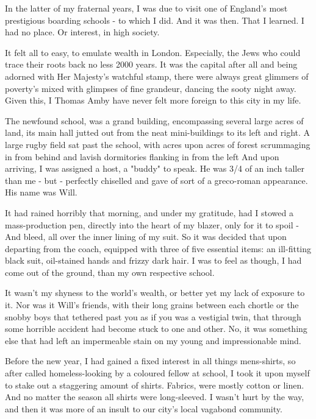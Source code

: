 \documentclass[12pt,openany]{book}
\begin{document}
In the latter of my fraternal years, I was
due to visit one of England's most
prestigious boarding schools - to which I did.
And it was then. That I learned. I had no place.
Or interest, in high society.

It felt all to easy, to emulate wealth
in London. Especially, the Jews
who could trace their roots back
no less 2000 years.
It was the capital after all and being
adorned with Her Majesty's watchful stamp,
there were always great glimmers of poverty's
mixed with glimpses of fine grandeur,
dancing the sooty night away. Given this,
I Thomas Amby have never felt more foreign
to this city in my life.

The newfound school, was a grand building,
encompassing several large acres of land, its main
hall jutted out from the neat
mini-buildings to its left and right.
A large rugby field sat past
the school, with acres upon
acres of forest scrummaging
in from behind and lavish dormitories flanking
in from the left
And upon arriving, I was
assigned a host, a "buddy" to speak. He
was 3/4 of an inch taller than me - but -
perfectly chiselled and gave of sort of a
greco-roman appearance. His name was Will.

It had rained horribly that morning,
and under my gratitude, had I stowed
a mass-production pen,
directly into the heart of my blazer,
only for it to spoil - And bleed,
all over the inner lining of my
suit. So it was decided that upon
departing from the coach, equipped
with three of five essential items:
an ill-fitting black suit, oil-stained
hands and frizzy dark hair. I was
to feel as though, I had come out of the
ground, than my own respective school.

It wasn't my shyness to the world's wealth,
or better yet my lack of exposure to it.
Nor was it Will's friends, with their
long grains between each chortle or
the snobby boys that tethered past you
as if you was a vestigial twin,
that through some horrible accident
had become stuck to one and other.
No, it was something else that had left
an impermeable stain on my young
and impressionable mind.

Before the new year, I had gained
a fixed interest in all things mens-shirts,
so after called homeless-looking by
a coloured fellow at school, I took
it upon myself to stake out a staggering
amount of shirts. Fabrics, were mostly cotton
or linen. And no matter the season
all shirts were long-sleeved.
I wasn't hurt by the way, and then it
was more of an insult to our city's local
vagabond community.
\end{document}
